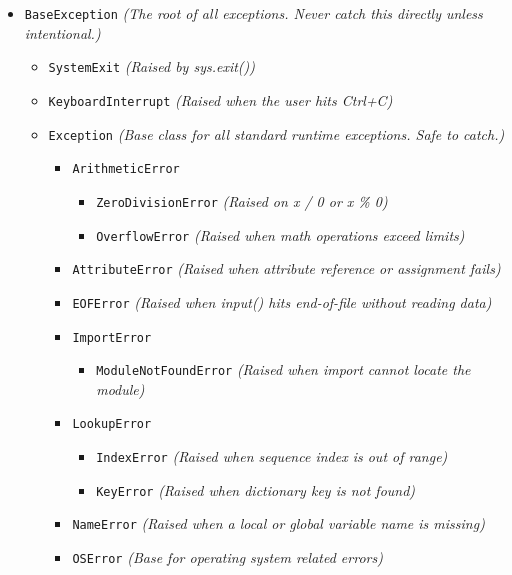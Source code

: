 \begin{itemize}[leftmargin=1.5em]
    \item \texttt{BaseException} \textit{(The root of all exceptions. Never catch this directly unless intentional.)}
    \begin{itemize}[leftmargin=1.5em]
        \item \texttt{SystemExit} \textit{(Raised by sys.exit())}
        \item \texttt{KeyboardInterrupt} \textit{(Raised when the user hits Ctrl+C)}
        \item \texttt{Exception} \textit{(Base class for all standard runtime exceptions. Safe to catch.)}
        \begin{itemize}[leftmargin=1.5em]
            \item \texttt{ArithmeticError}
            \begin{itemize}[leftmargin=1.5em]
                \item \texttt{ZeroDivisionError} \textit{(Raised on x / 0 or x \% 0)}
                \item \texttt{OverflowError} \textit{(Raised when math operations exceed limits)}
            \end{itemize}
            \item \texttt{AttributeError} \textit{(Raised when attribute reference or assignment fails)}
            \item \texttt{EOFError} \textit{(Raised when input() hits end-of-file without reading data)}
            \item \texttt{ImportError}
            \begin{itemize}[leftmargin=1.5em]
                \item \texttt{ModuleNotFoundError} \textit{(Raised when import cannot locate the module)}
            \end{itemize}
            \item \texttt{LookupError}
            \begin{itemize}[leftmargin=1.5em]
                \item \texttt{IndexError} \textit{(Raised when sequence index is out of range)}
                \item \texttt{KeyError} \textit{(Raised when dictionary key is not found)}
            \end{itemize}
            \item \texttt{NameError} \textit{(Raised when a local or global variable name is missing)}
            \item \texttt{OSError} \textit{(Base for operating system related errors)}

\end{itemize}
\end{itemize}
\end{itemize}
